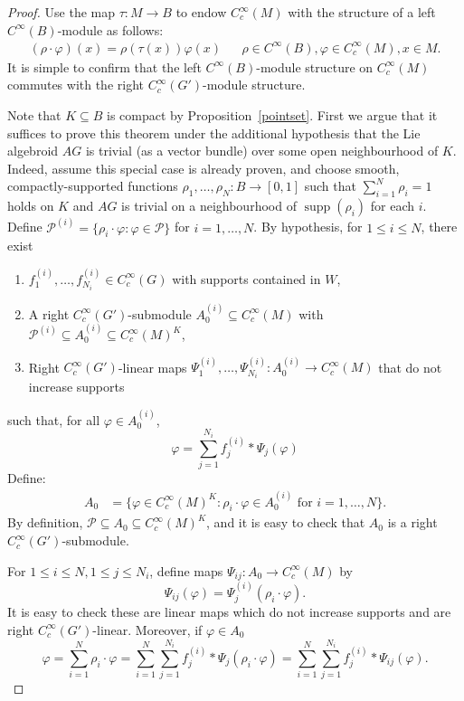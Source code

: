 \documentclass[12pt]{article}
\theoremstyle{plain}
\theoremstyle{definition}
\numberwithin{equation}{section}
\begin{document}
\begin{proof}
Use the map $\tau : M \to B$ to endow $C_c^\infty(M)$ with the structure of a left $C^\infty(B)$-module as follows:
\begin{align*}
(\rho \cdot \varphi)(x) = \rho(\tau(x))\varphi(x) && \rho \in C^\infty(B), \varphi \in C_c^\infty(M), x \in M.
\end{align*}
It is simple to confirm that the left $C^\infty(B)$-module structure  on $C_c^\infty(M)$ commutes with the right $C_c^\infty(G')$-module structure. 



Note that $K \subseteq B$ is compact by Proposition~\ref{pointset}. First we argue that it suffices to prove this theorem under the additional hypothesis that the Lie algebroid $AG$ is trivial (as a vector bundle) over some open neighbourhood of $K$. Indeed, assume this special case is already proven, and choose smooth, compactly-supported  functions $\rho_1,\ldots, \rho_N : B \to [0,1]$ such that $\sum_{i=1}^N \rho_i = 1$ holds on $K$ and  $AG$ is trivial on a neighbourhood of $\operatorname{supp}(\rho_i)$ for each $i$.  Define $\mathscr{P}^{(i)} = \{ \rho_i \cdot \varphi : \varphi \in \mathscr{P} \}$ for $i=1,\ldots,N$. By hypothesis, for $1 \leq i \leq N$, there exist
\begin{enumerate}
\item $f_1^{(i)},\ldots,f^{(i)}_{N_i} \in C_c^\infty(G)$ with supports contained in $W$, 
\item A right $C_c^\infty(G')$-submodule $A_0^{(i)} \subseteq C_c^\infty(M)$ with $\mathscr{P}^{(i)} \subseteq A_0^{(i)} \subseteq C_c^\infty(M)^K$,
\item Right $C_c^\infty(G')$-linear maps $\Psi_1^{(i)},\ldots,\Psi_{N_i}^{(i)} : A_0^{(i)} \to C_c^\infty(M)$ that do not increase supports
\end{enumerate}
such that, for all $\varphi \in A_0^{(i)}$, 
\[ \varphi = \sum_{j=1}^{N_i} f_j^{(i)} * \Psi_j(\varphi)  \]
Define:
\begin{align*}
A_0 &= \{ \varphi \in C_c^\infty(M)^K  : \rho_i \cdot \varphi  \in A_0^{(i)} \text{ for } i=1,\ldots,N \}.
\end{align*}
By definition, $\mathscr{P} \subseteq A_0 \subseteq C_c^\infty(M)^K$, and it is easy to check that $A_0$ is a right  $C_c^\infty(G')$-submodule. 

For $1 \leq i \leq N, 1 \leq j \leq N_i $, define  maps $\Psi_{ij} :A_0 \to C_c^\infty(M)$ by 
\[  \Psi_{ij}(\varphi) = \Psi_j^{(i)}(\rho_i \cdot \varphi). \]
It is easy to check these are linear maps which do not increase supports and are right $C_c^\infty(G')$-linear. Moreover, if $\varphi \in A_0$ 
\[ \varphi  = \sum_{i=1}^N \rho_i \cdot \varphi 
= \sum_{i=1}^N  \sum_{j=1}^{N_i} f^{(i)}_j * \Psi_j(\rho_i \cdot \varphi) 
= \sum_{i=1}^N \sum_{j=1}^{N_i} f_j^{(i)} * \Psi_{ij}(\varphi).
\]


\end{proof}
\end{document}
